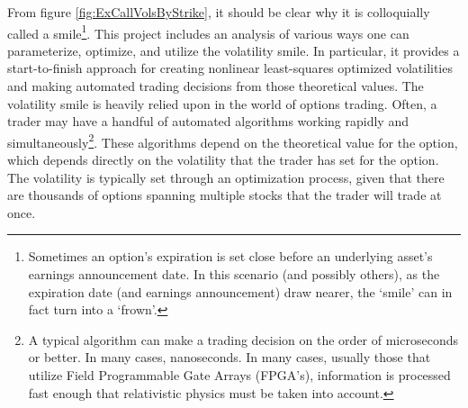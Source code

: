 \documentclass[12pt, a4paper, notitlepage]{article}
\numberwithin{equation}{subsection}
\numberwithin{figure}{subsection}
\numberwithin{table}{subsection}
\newcommand{\newpar}{\newline \newline}
\begin{document}
From figure \ref{fig:ExCallVolsByStrike}, it should be clear why it is colloquially called a smile\footnote{Sometimes an option's expiration is set close before an underlying asset's earnings announcement date.  In this scenario (and possibly others), as the expiration date (and earnings announcement) draw nearer, the `smile' can in fact turn into a `frown'.}.
\newpar
This project includes an analysis of various ways one can parameterize, optimize, and utilize the volatility smile.  In particular, it provides a start-to-finish approach for creating nonlinear least-squares optimized volatilities and making automated trading decisions from those theoretical values.
\newpar
The volatility smile is heavily relied upon in the world of options trading.  Often, a trader may have a handful of automated algorithms working rapidly and simultaneously\footnote{A typical algorithm can make a trading decision on the order of microseconds or better.  In many cases, nanoseconds.  In many cases, usually those that utilize Field Programmable Gate Arrays (FPGA's), information is processed fast enough that relativistic physics must be taken into account.}.  These algorithms depend on the theoretical value for the option, which depends directly on the volatility that the trader has set for the option.  The volatility is typically set through an optimization process, given that there are thousands of options spanning multiple stocks that the trader will trade at once.

\newpage
\end{document}
